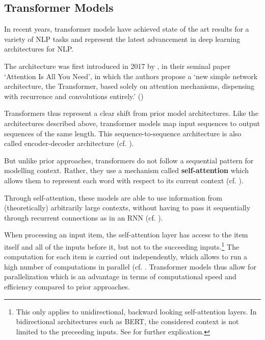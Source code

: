 \subsection{Transformer Models}
In recent years, transformer models have achieved state of the art results for a variety of NLP tasks and represent the latest advancement in deep learning architectures for NLP. 

The architecture was first introduced in 2017 by \citeauthor{vaswani_2017}, in their seminal paper `Attention Is All You Need', in which the authors propose a `new simple network architecture, the Transformer, based solely on attention mechanisms, dispensing with recurrence and convolutions entirely.' (\cite{vaswani_2017})

Transformers thus represent a clear shift from prior model architectures. Like the architectures described above, transformer models map input sequences to output sequences of the same length. This sequence-to-sequence architecture is also called encoder-decoder architecture (cf. \cite[3]{tunstall_natural_2022}). 

But unlike prior approaches, transformers do not follow a sequential pattern for modelling context. Rather, they use a mechanism called \textbf{self-attention} which allows them to represent each word with respect to its current context (cf. \cite[25-26]{vajjala_practical_2020}). 

Through self-attention, these models are able to use information from (theoretically) arbitrarily large contexts, without having to pass it sequentially through recurrent connections as in an RNN (cf. \cite[17]{jurafsky_2021_9}). 

When processing an input item, the self-attention layer has access to the item itself and all of the inputs before it, but not to the succeeding inputs.\footnote{This only applies to unidirectional, backward looking self-attention layers. In bidirectional architectures such as BERT, the considered context is not limited to the preceeding inputs. See \cite{devlin_2018} for further explication.}
The computation for each item is carried out independently, which allows to run a high number of computations in parallel (cf. \cite[18]{jurafsky_2021_9}. Transformer models thus allow for parallelization which is an advantage in terms of computational speed and efficiency compared to prior approaches.


